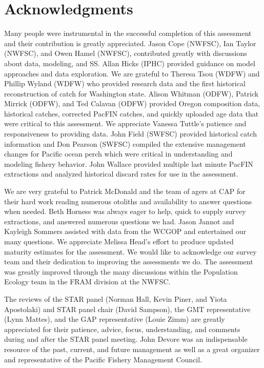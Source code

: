 \documentclass[12pt,]{article}
\begin{document}
\section{Acknowledgments}\label{acknowledgments}

Many people were instrumental in the successful completion of this
assessment and their contribution is greatly appreciated. Jason Cope
(NWFSC), Ian Taylor (NWFSC), and Owen Hamel (NWFSC), contributed greatly
with discussions about data, modeling, and SS. Allan Hicks (IPHC)
provided guidance on model approaches and data exploration. We are
grateful to Theresa Tsou (WDFW) and Phillip Wyland (WDFW) who provided
research data and the first historical reconstruction of catch for
Washington state. Alison Whitman (ODFW), Patrick Mirrick (ODFW), and Ted
Calavan (ODFW) provided Oregon composition data, historical catches,
corrected PacFIN catches, and quickly uploaded age data that were
critical to this assessment. We appreciate Vanessa Tuttle's patience and
responsiveness to providing data. John Field (SWFSC) provided historical
catch information and Don Pearson (SWFSC) compiled the extensive
management changes for Pacific ocean perch which were critical in
understanding and modeling fishery behavior. John Wallace provided
multiple last minute PacFIN extractions and analyzed historical discard
rates for use in the assessment.

We are very grateful to Patrick McDonald and the team of agers at CAP
for their hard work reading numerous otoliths and availability to answer
questions when needed. Beth Horness was always eager to help, quick to
supply survey extractions, and answered numerous questions we had. Jason
Jannot and Kayleigh Sommers assisted with data from the WCGOP and
entertained our many questions. We appreciate Melissa Head's effort to
produce updated maturity estimates for the assessment. We would like to
acknowledge our survey team and their dedication to improving the
assessments we do. The assessment was greatly improved through the many
discussions within the Population Ecology team in the FRAM division at
the NWFSC.

The reviews of the STAR panel (Norman Hall, Kevin Piner, and Yiota
Apostolaki) and STAR panel chair (David Sampson), the GMT representative
(Lynn Mattes), and the GAP representative (Louie Zimm) are greatly
appreciated for their patience, advice, focus, understanding, and
comments during and after the STAR panel meeting. John Devore was an
indispensable resource of the past, current, and future management as
well as a great organizer and representative of the Pacific Fishery
Management Council.
\end{document}
